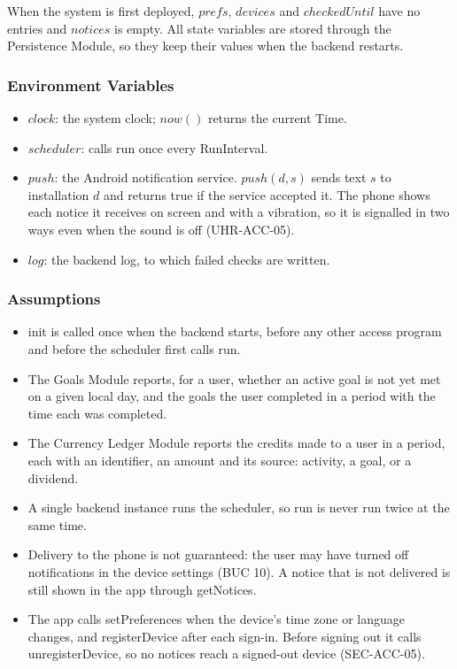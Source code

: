 \documentclass[12pt, titlepage]{article}
\begin{document}
\noindent When the system is first deployed, $\mathit{prefs}$,
$\mathit{devices}$ and $\mathit{checkedUntil}$ have no entries and
$\mathit{notices}$ is empty. All state variables are stored through the
Persistence Module, so they keep their values when the backend restarts.

\subsubsection{Environment Variables}

\begin{itemize}
\item $\mathit{clock}$: the system clock; $\mathit{now}()$ returns the
  current Time.
\item $\mathit{scheduler}$: calls run once every \textsf{RunInterval}.
\item $\mathit{push}$: the Android notification service.
  $\mathit{push}(d, s)$ sends text $s$ to installation $d$ and returns true if
  the service accepted it. The phone shows each notice it receives on screen
  and with a vibration, so it is signalled in two ways even when the sound is
  off (UHR-ACC-05).
\item $\mathit{log}$: the backend log, to which failed checks are written.
\end{itemize}

\subsubsection{Assumptions}

\begin{itemize}
\item init is called once when the backend starts, before any other access
  program and before the scheduler first calls run.
\item The Goals Module reports, for a user, whether an active goal is not
  yet met on a given local day, and the goals the user completed in a period
  with the time each was completed.
\item The Currency Ledger Module reports the credits made to a user in a
  period, each with an identifier, an amount and its source: activity, a
  goal, or a dividend.
\item A single backend instance runs the scheduler, so run is never run
  twice at the same time.
\item Delivery to the phone is not guaranteed: the user may have turned off
  notifications in the device settings (BUC 10). A notice that is not
  delivered is still shown in the app through getNotices.
\item The app calls setPreferences when the device's time zone or language
  changes, and registerDevice after each sign-in. Before signing out it calls
  unregisterDevice, so no notices reach a signed-out device (SEC-ACC-05).
\end{itemize}
\end{document}
